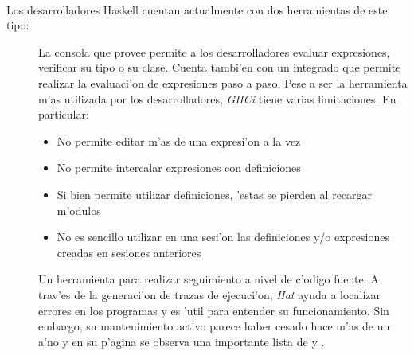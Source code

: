 \documentclass[a4paper]{article}
\begin{document}
\paragraph{}Los desarrolladores Haskell cuentan actualmente con dos herramientas de este tipo:
\begin{description}
	\item[]
		La consola que provee  permite a los desarrolladores evaluar expresiones, verificar su tipo o su clase.  Cuenta tambi'en con un  integrado que permite realizar la evaluaci'on de expresiones paso a paso.  Pese a ser la herramienta m'as utilizada por los desarrolladores, \textit{GHCi} tiene varias limitaciones.  En particular:
		\begin{itemize}
			\item No permite editar m'as de una expresi'on a la vez
			\item No permite intercalar expresiones con definiciones
			\item	Si bien permite utilizar definiciones, 'estas se pierden al recargar m'odulos
			\item No es sencillo utilizar en una sesi'on las definiciones y/o expresiones creadas en sesiones anteriores
		\end{itemize}
	\item[]
		Un herramienta para realizar seguimiento a nivel de c'odigo fuente.  A trav'es de la generaci'on de trazas de ejecuci'on, \textit{Hat} ayuda a localizar errores en los programas y es 'util para entender su funcionamiento.  Sin embargo, su mantenimiento activo parece haber cesado hace m'as de un a'no y en su p'agina se observa una importante lista de  y .
\end{description}
\end{document}
